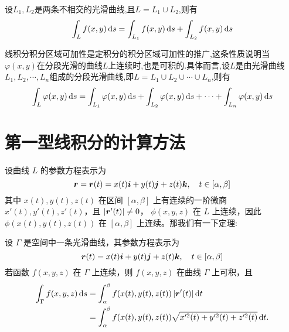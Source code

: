 \begin{proposition}
    [积分区域可加性]

    设$L_1,L_2$是两条不相交的光滑曲线,且$L = L_1 \cup L_2$,则有
    $$\int_L f(x,y) \operatorname{d\!} s = \int_{L_1} f(x,y) \operatorname{d\!} s + \int_{L_2} f(x,y) \operatorname{d\!} s$$

\end{proposition}

线积分积分区域可加性是定积分的积分区域可加性的推广,这条性质说明当$\varphi(x,y)$在分段光滑的曲线$L$上连续时,也是可积的.具体而言,设$L$是由光滑曲线$L_1,L_2,\cdots,L_n$组成的分段光滑曲线,即$L = L_1 \cup L_2 \cup \cdots \cup L_n$,则有
$$\int_L \varphi(x,y) \operatorname{d\!} s = \int_{L_1} \varphi(x,y) \operatorname{d\!} s + \int_{L_2} \varphi(x,y) \operatorname{d\!} s + \cdots + \int_{L_n} \varphi(x,y) \operatorname{d\!} s$$


\section{第一型线积分的计算方法}

设曲线 \( L \) 的参数方程表示为
\[
\bm{r} = \bm{r}(t) = x(t)\bm{i} + y(t)\bm{j} + z(t)\bm{k}, \quad t \in [\alpha, \beta]
\]
其中 \( x(t), y(t), z(t) \) 在区间 \( [\alpha, \beta] \) 上有连续的一阶微商 \( x'(t), y'(t), z'(t) \)，且 \( |\bm{r}'(t)| \ne 0 \)，  
\( \phi(x, y, z) \) 在 \( L \) 上连续，因此 \( \phi(x(t), y(t), z(t)) \) 在 \( [\alpha, \beta] \) 上连续。那我们有一下定理:

\begin{theorem}[第一类线积分的计算]
    设 \( \Gamma \) 是空间中一条光滑曲线，其参数方程表示为
\[
\bm{r}(t) = x(t)\bm{i} + y(t)\bm{j} + z(t)\bm{k}, \quad t \in [\alpha, \beta]
\]
若函数 \( f(x, y, z) \) 在 \( \Gamma \) 上连续，则 \( f(x, y, z) \) 在曲线 \( \Gamma \) 上可积，且
\begin{align*}
\int_{\Gamma} f(x, y, z)\operatorname{d\!} s &= \int_{\alpha}^{\beta} f(x(t), y(t), z(t)) \left|\bm{r}'(t)\right| \operatorname{d\!} t \\
&= \int_{\alpha}^{\beta} f(x(t), y(t), z(t)) \sqrt{x'^2(t) + y'^2(t) + z'^2(t)} \operatorname{d\!} t.
\end{align*}
\end{theorem}

